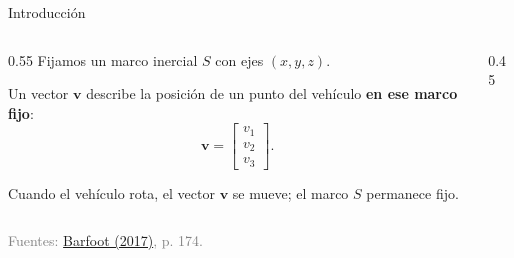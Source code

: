 \documentclass[11pt]{beamer}
\newcommand{\srcBarfoot}{\href{https://asrl.utias.utoronto.ca/~tdb/bib/barfoot_ser17.pdf}{Barfoot (2017)}}
\newcommand{\SourceLine}[1]{\vfill{\tiny\textcolor{gray}{Fuentes: #1}}}
\begin{document}
\begin{frame}{Introducción}

    \begin{columns}[T]
        \begin{column}{0.55\textwidth}
            Fijamos un marco inercial \(S\) con ejes \((x,y,z)\).

            \medskip
            Un vector \(\bm{v}\) describe la posición de un punto del vehículo \textbf{en ese marco fijo}:
            \[
            \bm{v} =
            \begin{bmatrix} v_1\\ v_2\\ v_3 \end{bmatrix}.
            \]

            \medskip
            Cuando el vehículo rota, el vector \(\bm{v}\) se mueve; el marco \(S\) permanece fijo.
        \end{column}

        \begin{column}{0.45\textwidth}
        \end{column}
    \end{columns}

    \SourceLine{\srcBarfoot, p. 174.}
\end{frame}

\end{document}
